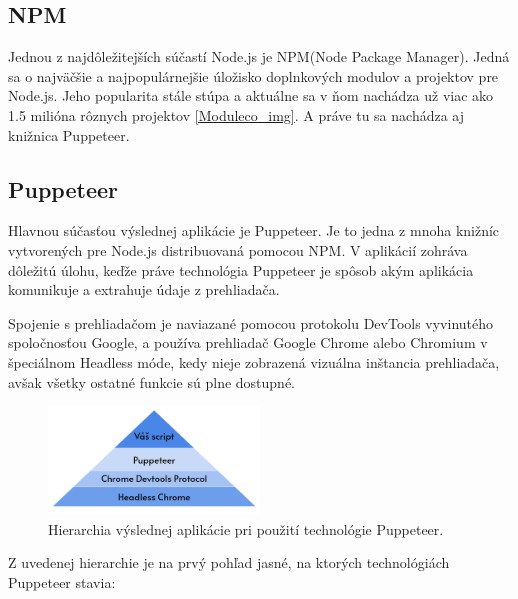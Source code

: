 \subsection{NPM}

Jednou z najdôležitejších súčastí Node.js je NPM(Node Package Manager). Jedná sa o najväčšie a najpopulárnejšie úložisko doplnkových modulov a projektov pre Node.js. Jeho popularita stále stúpa a aktuálne sa v ňom nachádza už viac ako 1.5 milióna rôznych projektov \ref{Moduleco_img}\cite{npm}. A práve tu sa nachádza aj knižnica Puppeteer.

\newpage
\subsection{Puppeteer}

Hlavnou súčasťou výslednej aplikácie je Puppeteer. Je to jedna z mnoha knižníc vytvorených pre Node.js distribuovaná pomocou NPM. V aplikácií zohráva dôležitú úlohu, keďže práve technológia Puppeteer je spôsob akým aplikácia komunikuje a extrahuje údaje z prehliadača. 

Spojenie s prehliadačom je naviazané pomocou protokolu DevTools vyvinutého spoločnosťou Google, a používa prehliadač Google Chrome alebo Chromium v špeciálnom Headless móde, kedy nieje zobrazená vizuálna inštancia prehliadača, avšak všetky ostatné funkcie sú plne dostupné. \cite{puppeteer}

\bigskip

\begin{figure}[hbt]
	\centering
	\includegraphics[width=0.5\textwidth]{obrazky-figures/puppepyramid.png}
	\caption{Hierarchia výslednej aplikácie pri použití technológie Puppeteer.}
	\label{pupepyramid_img}
\end{figure}

\bigskip

Z uvedenej hierarchie je na prvý pohľad jasné, na ktorých technológiách Puppeteer stavia:


